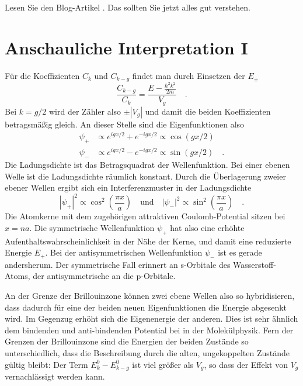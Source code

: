 \begin{questions}
    \item Lesen Sie den Blog-Artikel \cite{Polakovic_cmpm3}. Das sollten Sie jetzt alles gut verstehen.
\end{questions}


\section*{Anschauliche Interpretation I}


Für die  Koeffizienten  $C_{k}$ und $C_{k - g}$ findet man durch Einsetzen der $E_\pm$
\begin{equation}
    \frac{ C_{k-g} }{ C_{k}} = \frac{E - \frac{\hbar^2 k^2}{2m}  }{V_g} \quad .
\end{equation}
Bei $k = g/2$ wird der Zähler also $\pm |V_g|$ und damit die beiden Koeffizienten betragsmäßig gleich.
An dieser Stelle sind die Eigenfunktionen  also
\begin{eqnarray}
    \psi_+ & \propto e^{i g x /2} +  e^{-i g x /2} \propto \cos (gx /2) \\
    \psi_- &\propto e^{i g x /2} -  e^{-i g x /2} \propto \sin (gx /2) \quad .
\end{eqnarray}
Die Ladungsdichte ist das Betragsquadrat der Wellenfunktion. Bei einer ebenen Welle ist die Ladungsdichte räumlich konstant. Durch die Überlagerung zweier ebener Wellen ergibt sich ein Interferenzmuster in der Ladungsdichte
\begin{equation}
    |\psi_+|^2 \propto \cos^2 \left( \frac{\pi x}{a}  \right) \quad \text{und} \quad  |\psi_-|^2 \propto \sin^2 \left( \frac{\pi x}{a}  \right)  \quad .
\end{equation}
Die Atomkerne mit dem zugehörigen attraktiven Coulomb-Potential sitzen bei $x = n a$. Die symmetrische Wellenfunktion $\psi_+$ hat also eine erhöhte Aufenthaltswahrscheinlichkeit in der Nähe der Kerne, und damit eine reduzierte Energie $E_+$. Bei der antisymmetrischen Wellenfunktion $\psi_-$ ist es gerade andersherum. Der symmetrische Fall erinnert an s-Orbitale des Wasserstoff-Atoms, der antisymmetrische an die p-Orbitale.

An der Grenze der Brillouinzone können zwei ebene Wellen also so hybridisieren, dass dadurch für eine der beiden neuen Eigenfunktionen die Energie abgesenkt wird. Im Gegenzug erhöht sich die Eigenenergie der anderen. Dies ist sehr ähnlich dem bindenden und anti-bindenden Potential bei  in der Molekülphysik. Fern der Grenzen der Brillouinzone sind die Energien der beiden Zustände so unterschiedlich, dass die Beschreibung durch die alten, ungekoppelten Zustände gültig bleibt: Der Term $ E_k^0 -   E_{k-g}^0$ ist viel größer als $V_g$, so dass der Effekt von $V_g$ vernachlässigt werden kann.

